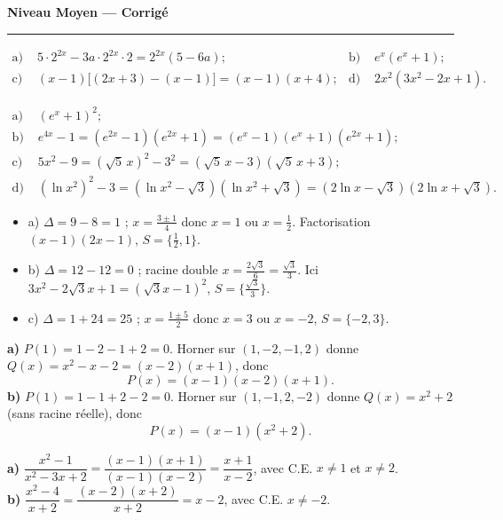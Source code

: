 \documentclass[11pt,a4paper]{article}
\begin{document}
\begin{center}
{\LARGE\bfseries\color{primarydark} Niveau Moyen — Corrigé}\\[2pt]
{\color{primary}\rule{0.45\textwidth}{1.2pt}}
\end{center}
\vspace{1mm}

\begin{corrige}
\begin{align*}
\text{a) }&5\cdot 2^{2x}-3a\cdot 2^{2x}\cdot 2=2^{2x}(5-6a); &
\text{b) }&e^{x}(e^{x}+1);\\
\text{c) }&(x-1)\bigl[(2x+3)-(x-1)\bigr]=(x-1)(x+4); &
\text{d) }&2x^{2}(3x^{2}-2x+1).
\end{align*}
\end{corrige}

\begin{corrige}
\begin{align*}
\text{a) }&(e^{x}+1)^{2};\\
\text{b) }&e^{4x}-1=(e^{2x}-1)(e^{2x}+1)=(e^{x}-1)(e^{x}+1)(e^{2x}+1);\\
\text{c) }&5x^{2}-9=(\sqrt5\,x)^{2}-3^{2}=(\sqrt5\,x-3)(\sqrt5\,x+3);\\
\text{d) }&(\ln x^{2})^{2}-3=(\ln x^{2}-\sqrt3)(\ln x^{2}+\sqrt3)=(2\ln x-\sqrt3)(2\ln x+\sqrt3).
\end{align*}
\end{corrige}

\begin{corrige}
\begin{itemize}[leftmargin=1.4em,topsep=1pt,itemsep=1pt]
  \item a) $\Delta=9-8=1$ ; $x=\tfrac{3\pm1}{4}$ donc $x=1$ ou $x=\tfrac12$. Factorisation $(x-1)(2x-1)$, $S=\{\tfrac12,1\}$.
  \item b) $\Delta=12-12=0$ ; racine double $x=\tfrac{2\sqrt3}{6}=\tfrac{\sqrt3}{3}$. Ici $3x^{2}-2\sqrt3x+1=(\sqrt3x-1)^{2}$, $S=\{\tfrac{\sqrt3}{3}\}$.
  \item c) $\Delta=1+24=25$ ; $x=\tfrac{1\pm5}{2}$ donc $x=3$ ou $x=-2$, $S=\{-2,3\}$.
\end{itemize}
\end{corrige}

\begin{corrige}[Horner]
\textbf{a)} $P(1)=1-2-1+2=0$. Horner sur $(1,-2,-1,2)$ donne $Q(x)=x^{2}-x-2=(x-2)(x+1)$, donc
\[ P(x)=(x-1)(x-2)(x+1). \]
\textbf{b)} $P(1)=1-1+2-2=0$. Horner sur $(1,-1,2,-2)$ donne $Q(x)=x^{2}+2$ (sans racine réelle), donc
\[ P(x)=(x-1)(x^{2}+2). \]
\end{corrige}

\begin{corrige}
\textbf{a)} $\dfrac{x^{2}-1}{x^{2}-3x+2}=\dfrac{(x-1)(x+1)}{(x-1)(x-2)}=\dfrac{x+1}{x-2}$, avec C.E. $x\neq1$ et $x\neq2$.\\
\textbf{b)} $\dfrac{x^{2}-4}{x+2}=\dfrac{(x-2)(x+2)}{x+2}=x-2$, avec C.E. $x\neq-2$.
\end{corrige}
\end{document}

